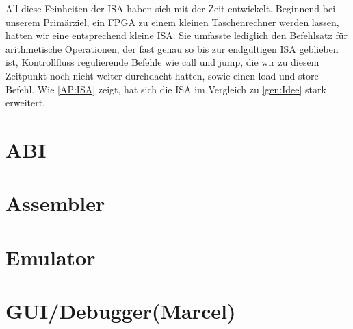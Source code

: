 All diese Feinheiten der ISA haben sich mit der Zeit entwickelt. Beginnend bei unserem Primärziel, ein FPGA zu einem kleinen Taschenrechner werden lassen, hatten wir eine entsprechend kleine ISA. Sie umfasste lediglich den Befehlsatz für arithmetische Operationen, der fast genau so bis zur endgültigen ISA geblieben ist, Kontrollfluss regulierende Befehle wie call und jump, die wir zu diesem Zeitpunkt noch nicht weiter durchdacht hatten, sowie einen load und store Befehl. Wie \autoref{AP:ISA} zeigt, hat sich die ISA im Vergleich zu \autoref{gen:Idee} stark erweitert. 


\section{ABI}

\section{Assembler} %

\section{Emulator} %

\section{GUI/Debugger(Marcel)}

